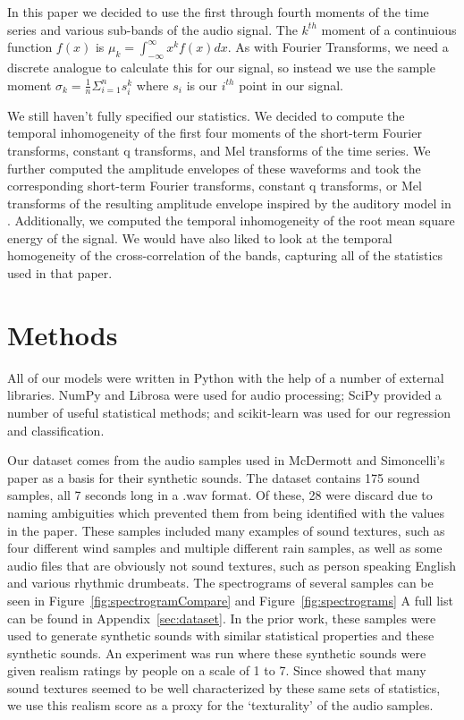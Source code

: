 \documentclass{sig-alternate-05-2015}
\begin{document}
In this paper we decided to use the first through fourth moments of the time series and various sub-bands of the audio signal. The $k^{th}$ moment of a continuious function $f(x)$ is $\mu_k = \int_{-\infty}^\infty x^kf(x)dx$. As with Fourier Transforms, we need a discrete analogue to calculate this for our signal, so instead we use the sample moment $\sigma_k = \frac{1}{n} \Sigma^n_{i=1} s_i^k$ where $s_i$ is our $i^{th}$ point in our signal.

We still haven't fully specified our statistics. We decided to compute the temporal inhomogeneity of the first four moments of the short-term Fourier transforms, constant q transforms, and Mel transforms of the time series. We further computed the amplitude envelopes of these waveforms and took the corresponding short-term Fourier transforms, constant q transforms, or Mel transforms of the resulting amplitude envelope inspired by the auditory model in \cite{McDermott2011926, mcdermott2013summary}. Additionally, we computed the temporal inhomogeneity of the root mean square energy of the signal. We would have also liked to look at the temporal homogeneity of the cross-correlation of the bands, capturing all of the statistics used in that paper.

\section{Methods}
\label{sec:methods}

All of our models were written in Python with the help of a number of external libraries. NumPy\cite{numpy} and Librosa\cite{mcfee2015librosa} were used for audio processing; SciPy\cite{scipy} provided a number of useful statistical methods; and scikit-learn\cite{scikit-learn} was used for our regression and classification.

Our dataset comes from the audio samples used in McDermott and Simoncelli's paper\cite{McDermott2011926} as a basis for their synthetic sounds. The dataset contains 175 sound samples, all 7 seconds long in a .wav format. Of these, 28 were discard due to naming ambiguities which prevented them from being identified with the values in the paper. These samples included many examples of sound textures, such as four different wind samples and multiple different rain samples, as well as some audio files that are obviously not sound textures, such as person speaking English and various rhythmic drumbeats. The spectrograms of several samples can be seen in Figure~\ref{fig:spectrogramCompare} and Figure~\ref{fig:spectrograms} A full list can be found in Appendix~\ref{sec:dataset}. In the prior work, these samples were used to generate synthetic sounds with similar statistical properties and these synthetic sounds. An experiment was run where these synthetic sounds were given realism ratings by people on a scale of 1 to 7. Since \cite{mcdermott2013summary} showed that many sound textures seemed to be well characterized by these same sets of statistics, we use this realism score as a proxy for the `texturality' of the audio samples.
\end{document}
